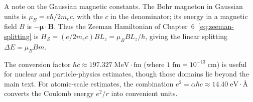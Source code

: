 A note on the Gaussian magnetic constants. The Bohr magneton in Gaussian units is $\mu_B = e\hbar/2m_e c$, with the $c$ in the denominator; its energy in a magnetic field $B$ is $-\bm\mu \cdot \bm B$. Thus the Zeeman Hamiltonian of Chapter~6~\eqref{eq:zeeman-splitting} is $H_Z = (e/2m_e c)B L_z = \mu_B B L_z/\hbar$, giving the linear splitting $\Delta E = \mu_B B m$.

The conversion factor $\hbar c \approx 197.327\;\mathrm{MeV{\cdot}fm}$ (where $1\;\mathrm{fm} = 10^{-13}\;\mathrm{cm}$) is useful for nuclear and particle-physics estimates, though those domains lie beyond the main text. For atomic-scale estimates, the combination $e^2 = \alpha\hbar c \approx 14.40\;\mathrm{eV{\cdot}\text{\AA}}$ converts the Coulomb energy $e^2/r$ into convenient units.

